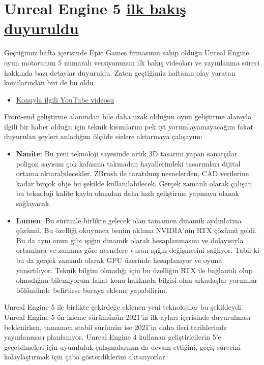 \documentclass[11pt]{article}
\begin{document}
\section{Unreal Engine 5 \href{https://www.unrealengine.com/en-US/blog/a-first-look-at-unreal-engine-5}{ilk bakış duyuruldu}}
\label{sec:org4003b1a}
Geçtiğimiz hafta içerisinde Epic Games firmasının sahip olduğu Unreal Engine
oyun motorunun 5 numaralı versiyonunun ilk bakış videoları ve yayınlanma
süreci hakkında bazı detaylar duyuruldu. Zaten geçtiğimiz haftanın olay
yaratan konularından biri de bu oldu.

\begin{itemize}
\item \href{https://www.youtube.com/watch?v=qC5KtatMcUw}{Konuyla ilgili YouTube videosu}
\end{itemize}

Front-end geliştirme alanından bile daha uzak olduğun oyun geliştirme alanıyla
ilgili bir haber olduğu için teknik kısımlarını pek iyi yorumlayamayacağım
fakat duyurulan şeyleri anladığım ölçüde sizlere aktarmaya çalışayım:

\begin{itemize}
\item \textbf{Nanite}: Bu yeni teknoloji sayesinde artık 3D tasarım yapan sanatçılar
poligon sayısını çok kafasına takmadan hayallerindeki tasarımları dijital
ortama aktarabilecekler. ZBrush ile taratılmış nesnelerden, CAD verilerine
kadar birçok obje bu şekilde kullanılabilecek. Gerçek zamanlı olarak
çalışan bu teknoloji kalite kaybı olmadan daha hızlı geliştirme yapmaya
olanak sağlayacak.
\item \textbf{Lumen}: Bu sürümle birlikte gelecek olan tamamen dinamik aydınlatma
çözümü. Bu özelliği okuyunca benim aklıma NVIDIA'nin RTX çözümü geldi. Bu
da aynı onun gibi ışığın dinamik olarak hesaplanmasını ve dolayısıyla
ortamlara ve zamana göre nesnelere vuran ışığın değişmesini sağlıyor. Tabii
ki bu da gerçek zamanlı olarak GPU üzerinde hesaplanıyor ve oyuna
yansıtılıyor. Teknik bilgim olmadığı için bu özelliğin RTX ile bağlantılı
olup olmadığını bilemiyorum fakat konu hakkında bilgisi olan arkadaşlar
yorumlar bölümünde belirtirse buraya ekleme yapabilirim.
\end{itemize}

Unreal Engine 5 ile birlikte çekirdeğe eklenen yeni teknolojiler bu
şekildeydi. Unreal Engine 5 ön izleme sürümünün 2021'in ilk ayları içerisinde
duyurulması beklenirken, tamamen stabil sürümün ise 2021'in daha ileri
tarihlerinde yayınlanması planlanıyor. Unreal Engine 4 kullanan
geliştiricilerin 5'e geçebilmeleri için uyumluluk çalışmalarının da devam
ettiğini, geçiş sürecini kolaylaştırmak için çaba gösterdiklerini
aktarıyorlar.
\end{document}
